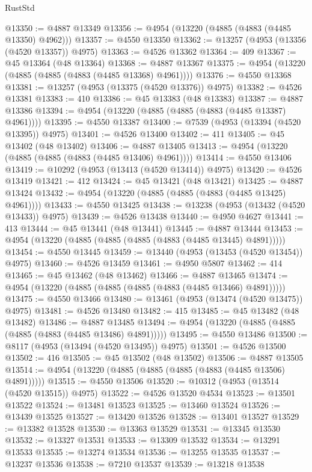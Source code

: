 \begin{lexlean}{RustStd}
\begin{coremodule}
@13350 := @4887 @13349
@13356 := @4954 (@13220 (@4885 (@4883 (@4485 @13350) @4962)))
@13357 := @4550 @13350
@13362 := @13257 (@4953 (@13356 (@4520 @13357)) @4975)
@13363 := @4526 @13362
@13364 := 409
@13367 := @45 @13364 (@48 @13364)
@13368 := @4887 @13367
@13375 := @4954 (@13220 (@4885 (@4885 (@4883 (@4485 @13368) @4961))))
@13376 := @4550 @13368
@13381 := @13257 (@4953 (@13375 (@4520 @13376)) @4975)
@13382 := @4526 @13381
@13383 := 410
@13386 := @45 @13383 (@48 @13383)
@13387 := @4887 @13386
@13394 := @4954 (@13220 (@4885 (@4885 (@4883 (@4485 @13387) @4961))))
@13395 := @4550 @13387
@13400 := @7539 (@4953 (@13394 (@4520 @13395)) @4975)
@13401 := @4526 @13400
@13402 := 411
@13405 := @45 @13402 (@48 @13402)
@13406 := @4887 @13405
@13413 := @4954 (@13220 (@4885 (@4885 (@4883 (@4485 @13406) @4961))))
@13414 := @4550 @13406
@13419 := @10292 (@4953 (@13413 (@4520 @13414)) @4975)
@13420 := @4526 @13419
@13421 := 412
@13424 := @45 @13421 (@48 @13421)
@13425 := @4887 @13424
@13432 := @4954 (@13220 (@4885 (@4885 (@4883 (@4485 @13425) @4961))))
@13433 := @4550 @13425
@13438 := @13238 (@4953 (@13432 (@4520 @13433)) @4975)
@13439 := @4526 @13438
@13440 := @4950 @4627
@13441 := 413
@13444 := @45 @13441 (@48 @13441)
@13445 := @4887 @13444
@13453 := @4954 (@13220 (@4885 (@4885 (@4885 (@4883 (@4485 @13445) @4891)))))
@13454 := @4550 @13445
@13459 := @13440 (@4953 (@13453 (@4520 @13454)) @4975)
@13460 := @4526 @13459
@13461 := @4950 @5807
@13462 := 414
@13465 := @45 @13462 (@48 @13462)
@13466 := @4887 @13465
@13474 := @4954 (@13220 (@4885 (@4885 (@4885 (@4883 (@4485 @13466) @4891)))))
@13475 := @4550 @13466
@13480 := @13461 (@4953 (@13474 (@4520 @13475)) @4975)
@13481 := @4526 @13480
@13482 := 415
@13485 := @45 @13482 (@48 @13482)
@13486 := @4887 @13485
@13494 := @4954 (@13220 (@4885 (@4885 (@4885 (@4883 (@4485 @13486) @4891)))))
@13495 := @4550 @13486
@13500 := @8117 (@4953 (@13494 (@4520 @13495)) @4975)
@13501 := @4526 @13500
@13502 := 416
@13505 := @45 @13502 (@48 @13502)
@13506 := @4887 @13505
@13514 := @4954 (@13220 (@4885 (@4885 (@4885 (@4883 (@4485 @13506) @4891)))))
@13515 := @4550 @13506
@13520 := @10312 (@4953 (@13514 (@4520 @13515)) @4975)
@13522 := @4526 @13520 @4534
@13523 := @13501 @13522
@13524 := @13481 @13523
@13525 := @13460 @13524
@13526 := @13439 @13525
@13527 := @13420 @13526
@13528 := @13401 @13527
@13529 := @13382 @13528
@13530 := @13363 @13529
@13531 := @13345 @13530
@13532 := @13327 @13531
@13533 := @13309 @13532
@13534 := @13291 @13533
@13535 := @13274 @13534
@13536 := @13255 @13535
@13537 := @13237 @13536
@13538 := @7210 @13537
@13539 := @13218 @13538

\end{coremodule}
\end{lexlean}
